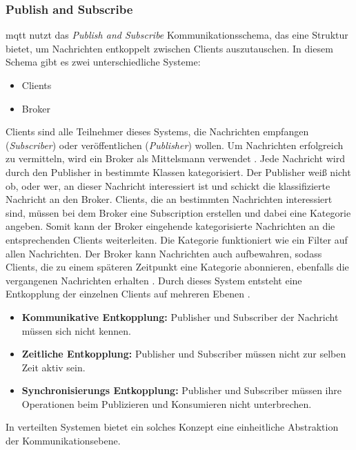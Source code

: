 \subsubsection{Publish and Subscribe} \label{s:publish-subscribe}
\ac{mqtt} nutzt das \textit{Publish and Subscribe} Kommunikationsschema, das eine Struktur bietet, um Nachrichten entkoppelt zwischen Clients auszutauschen. In diesem Schema gibt es zwei unterschiedliche Systeme:
\begin{itemize}
    \item Clients
    \item Broker
\end{itemize}
Clients sind alle Teilnehmer dieses Systems, die Nachrichten empfangen (\textit{Subscriber}) oder veröffentlichen (\textit{Publisher}) wollen. Um Nachrichten erfolgreich zu vermitteln, wird ein Broker als Mittelsmann verwendet \cite{teamGettingStartedMQTT}.
Jede Nachricht wird durch den Publisher in bestimmte Klassen kategorisiert. Der Publisher wei{\ss} nicht ob, oder wer, an dieser Nachricht interessiert ist und schickt die klassifizierte Nachricht an den Broker.
Clients, die an bestimmten Nachrichten interessiert sind, müssen bei dem Broker eine Subscription erstellen und dabei eine Kategorie angeben.
Somit kann der Broker eingehende kategorisierte Nachrichten an die entsprechenden Clients weiterleiten. Die Kategorie funktioniert wie ein Filter auf allen Nachrichten.
Der Broker kann Nachrichten auch aufbewahren, sodass Clients, die zu einem späteren Zeitpunkt eine Kategorie abonnieren, ebenfalls die vergangenen Nachrichten erhalten \cite{EverythingYouNeed}.
Durch dieses System entsteht eine Entkopplung der einzelnen Clients auf mehreren Ebenen \cite{teamPublishSubscribeMQTT}.
\begin{itemize}
    \item \textbf{Kommunikative Entkopplung:} Publisher und Subscriber der Nachricht müssen sich nicht kennen.
    \item \textbf{Zeitliche Entkopplung:} Publisher und Subscriber müssen nicht zur selben Zeit aktiv sein.
    \item \textbf{Synchronisierungs Entkopplung:} Publisher und Subscriber müssen ihre Operationen beim Publizieren und Konsumieren nicht unterbrechen.
\end{itemize}
In verteilten Systemen bietet ein solches Konzept eine einheitliche Abstraktion der Kommunikationsebene.
\cite{domingusDistributedSystemsIntroduction2020}
